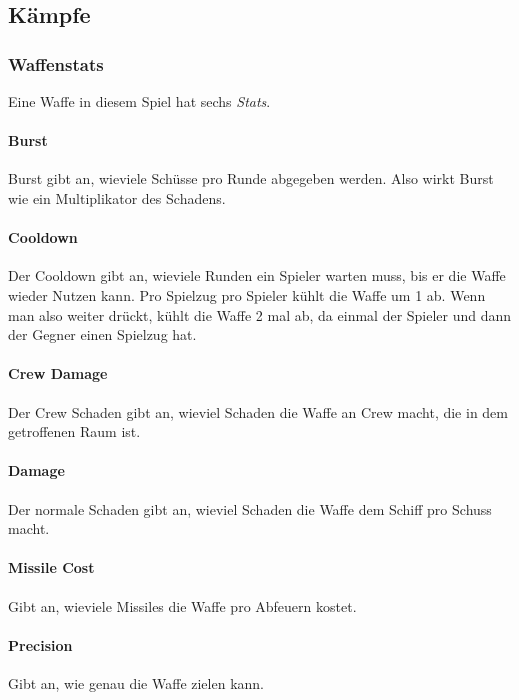 \documentclass[fontsize=12pt,paper=a4,twoside]{scrartcl}
\begin{document}
\subsection{Kämpfe}

\subsubsection{Waffenstats}

Eine Waffe in diesem Spiel hat sechs \textit{Stats}. 

\paragraph{Burst}
Burst gibt an, wieviele Schüsse pro Runde abgegeben werden. Also wirkt Burst wie ein Multiplikator des Schadens. 

\paragraph{Cooldown} 
Der Cooldown gibt an, wieviele Runden ein Spieler warten muss, bis er die Waffe wieder Nutzen kann. Pro Spielzug pro Spieler kühlt die Waffe um 1 ab. Wenn man also weiter drückt, kühlt die Waffe 2 mal ab, da einmal der Spieler und dann der Gegner einen Spielzug hat. 

\paragraph{Crew Damage}
Der Crew Schaden gibt an, wieviel Schaden die Waffe an Crew macht, die in dem getroffenen Raum ist. 

\paragraph{Damage}

Der normale Schaden gibt an, wieviel Schaden die Waffe dem Schiff pro Schuss macht. 

\paragraph{Missile Cost}

Gibt an, wieviele Missiles die Waffe pro Abfeuern kostet. 

\paragraph{Precision} Gibt an, wie genau die Waffe zielen kann.
\end{document}
